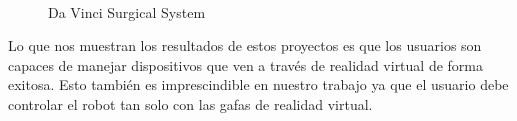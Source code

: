 \documentclass[twoside, 11pt]{epstfg}
\begin{document}
\begin{figure}[H]
	\centering
	\\
	\caption{Da Vinci Surgical System}
	 \label{daVinci}
\end{figure}




Lo que nos muestran los resultados de estos proyectos es que los usuarios son capaces de manejar dispositivos que ven a través de realidad virtual de forma exitosa. Esto también es imprescindible en nuestro trabajo ya que el usuario debe controlar el robot tan solo con las gafas de realidad virtual. 

\end{document}
